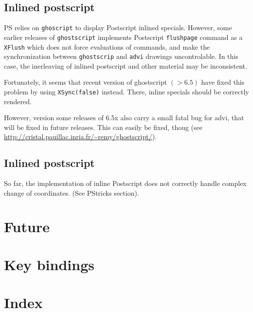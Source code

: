 \documentclass{article}
\begin{document}
\subsection*{Inlined postscript}

PS relies on {\tt ghoscript} to display Postscript inlined specials.
However, some earlier releases of {\tt ghostscript} 
implements Postscript {\tt flushpage} command as a {\tt XFlush} 
which does not force evaluations of commands, and make the 
synchronization between {\tt ghostscrip} and {\tt advi} drawings 
uncontrolable. In this case, the inerleaving of inlined postscript 
and other material may be inconsistent. 

Fortunately, it seems that recent version of ghostscript $(> 6.5)$ have
fixed this problem by using {\tt XSync(false)} instead.
There, inline specials should be correctly rendered. 

However, version some releases of 6.5x also carry a small fatal bug for
advi, that will be fixed in future releases. This can easily be fixed, thoug 
(see \url{http://cristal.pauillac.inria.fr/~remy/ghostscript/}).

\subsection*{Inlined postscript}

So far, the implementation of inline Postscript does not correctly handle
complex change of coordinates.  (See PStricks section). 


\section {Future}

\section {Key bindings}

\section {Index}

\printindex
\end{document}
